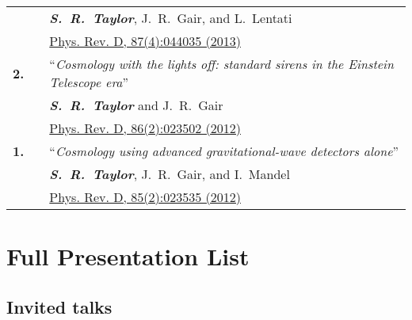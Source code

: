 \documentclass[11pt,letterpaper,sans]{moderncv}
\begin{document}
{\begin{longtable}{rp{0.3cm}p{15.8cm}}
&& \textit{\textbf{S.~R.~Taylor}}, J.~R.~Gair, and L.~Lentati \\ 
&& \href{http://journals.aps.org/prd/abstract/10.1103/PhysRevD.87.044035}{{\color{color1} Phys. Rev. D, 87(4):044035 (2013)}} \vspace{0.09cm}\\
\textbf{2.} & & ``\textit{Cosmology with the lights off: standard sirens in the Einstein Telescope era}'' \\ 
&& \textit{\textbf{S.~R.~Taylor}} and J.~R.~Gair \\ 
&& \href{http://journals.aps.org/prd/abstract/10.1103/PhysRevD.86.023502}{{\color{color1} Phys. Rev. D, 86(2):023502 (2012)}} \vspace{0.09cm}\\
\textbf{1.} & & ``\textit{Cosmology using advanced gravitational-wave detectors alone}'' \\ 
&& \textit{\textbf{S.~R.~Taylor}}, J.~R.~Gair, and I.~Mandel \\ 
&& \href{http://journals.aps.org/prd/abstract/10.1103/PhysRevD.85.023535}{{\color{color1} Phys. Rev. D, 85(2):023535 (2012)}} \vspace{0.09cm}\\
\end{longtable}
}

\pagebreak


\section{Full Presentation List}
\vspace{-0.3cm}
\subsection{Invited talks} \vspace{-0.3cm}
\end{document}
